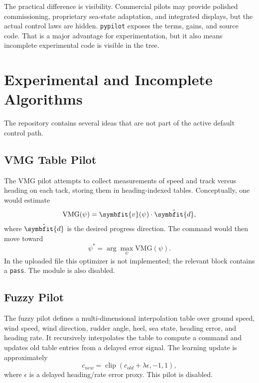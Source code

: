 \documentclass[11pt,twocolumn]{article}
\newcommand{\vct}[1]{\symbfit{#1}}   %
\newcommand{\clip}{\operatorname{clip}}
\newcommand{\heading}{\psi}
\begin{document}
The practical difference is visibility.  Commercial pilots may provide polished
commissioning, proprietary sea-state adaptation, and integrated displays, but the actual
control laws are hidden.  \texttt{pypilot} exposes the terms, gains, and source code.
That is a major advantage for experimentation, but it also means incomplete experimental
code is visible in the tree.

\section{Experimental and Incomplete Algorithms}

The repository contains several ideas that are not part of the active default control path.

\subsection{VMG Table Pilot}

The VMG pilot attempts to collect measurements of speed and track versus heading on each
tack, storing them in heading-indexed tables.  Conceptually, one would estimate
\begin{equation}
  \mathrm{VMG}(\heading) = \vct{v}(\heading)\cdot \hat{\vct{d}},
\end{equation}
where \(\hat{\vct{d}}\) is the desired progress direction.  The command would then move
toward
\begin{equation}
  \heading^* = \arg\max_{\heading} \mathrm{VMG}(\heading).
\end{equation}
In the uploaded file this optimizer is not implemented; the relevant block contains a
\texttt{pass}.  The module is also disabled.

\subsection{Fuzzy Pilot}

The fuzzy pilot defines a multi-dimensional interpolation table over ground speed, wind
speed, wind direction, rudder angle, heel, sea state, heading error, and heading rate.
It recursively interpolates the table to compute a command and updates old table entries
from a delayed error signal.  The learning update is approximately
\begin{equation}
  c_{new} = \clip(c_{old} + \lambda\epsilon, -1, 1),
\end{equation}
where \(\epsilon\) is a delayed heading/rate error proxy.  This pilot is disabled.
\end{document}
